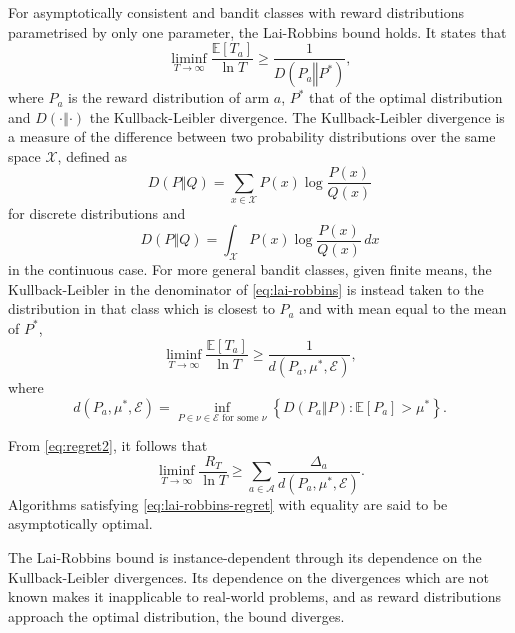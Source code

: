 For asymptotically consistent and bandit classes with reward distributions parametrised by only one parameter, the Lai-Robbins bound \autocite{lai1985} holds.
It states that
\begin{equation}
    \liminf_{T\to\infty} \frac{\mathbb{E}[T_a]}{\ln T} \geq \frac{1}{D(P_a \mathrel{\Vert} P^*)},
    \label{eq:lai-robbins-times}
\end{equation}
where $P_a$ is the reward distribution of arm $a$, $P^*$ that of the optimal distribution and $D(\cdot \mathrel{\Vert} \cdot)$ the Kullback-Leibler divergence.
The Kullback-Leibler divergence is a measure of the difference between two probability distributions over the same space $\mathcal{X}$, defined as
\begin{equation}
    D(P \mathrel{\Vert} Q) = \sum_{x \in \mathcal{X}} P(x) \log \frac{P(x)}{Q(x)}
\end{equation}
for discrete distributions and
\begin{equation}
    D(P \mathrel{\Vert} Q) = \int_{\mathcal{X}} P(x) \log \frac{P(x)}{Q(x)} \, dx
\end{equation}
in the continuous case.
For more general bandit classes, given finite means, the Kullback-Leibler in the denominator of \cref{eq:lai-robbins} is instead taken to the distribution in that class which is closest to $P_a$ and with mean equal to the mean of $P^*$,
\begin{equation}
    \liminf_{T\to\infty} \frac{\mathbb{E}[T_a]}{\ln T} \geq \frac{1}{d(P_a, \mu^*, \mathcal{E})},
    \label{eq:lai-robbins}
\end{equation}
where
\begin{equation}
    d(P_a, \mu^*, \mathcal{E}) =
    \inf_{P \in \nu \in \mathcal{E} \text{ for some } \nu}
    \left\{ D(P_a \mathrel{\Vert} P): \mathbb{E}[P_a] > \mu^* \right\}.
\end{equation}


From \cref{eq:regret2}, it follows that
\begin{equation}
    \liminf_{T\to\infty} \frac{R_T}{\ln T}
    \geq
    \sum_{a \in \mathcal{A}}\frac{\Delta_a}{d(P_a, \mu^*, \mathcal{E})}.
    \label{eq:lai-robbins-regret}
\end{equation}
Algorithms satisfying \cref{eq:lai-robbins-regret} with equality are said to be asymptotically optimal.

The Lai-Robbins bound is instance-dependent through its dependence on the Kullback-Leibler divergences.
Its dependence on the divergences which are not known makes it inapplicable to real-world problems,
and as reward distributions approach the optimal distribution, the bound diverges.


